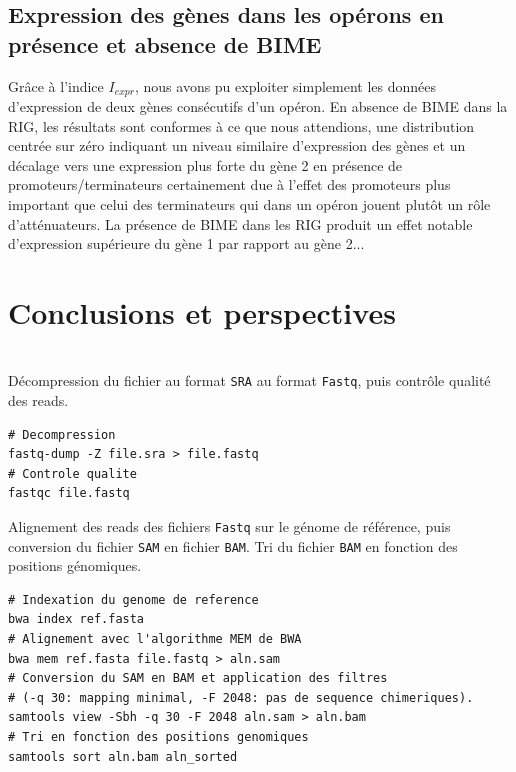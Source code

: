 \documentclass[12pt,a4paper]{report}
\begin{document}
\begin{onehalfspace}
\section*{Expression des gènes dans les opérons en présence et absence de BIME}
Grâce à l'indice $I_{expr}$, nous avons pu exploiter simplement les données d'expression de deux gènes consécutifs d'un opéron. En absence de BIME dans la RIG, les résultats sont conformes à ce que nous attendions, une distribution centrée sur zéro indiquant un niveau similaire d'expression des gènes et un décalage vers une expression plus forte du gène 2 en présence de promoteurs/terminateurs certainement due à l'effet des promoteurs plus important que celui des terminateurs qui dans un opéron jouent plutôt un rôle d'atténuateurs. La présence de BIME dans les RIG produit un effet notable d'expression supérieure du gène 1 par rapport au gène 2...




\chapter*{Conclusions et perspectives}

\end{onehalfspace}


\renewcommand{\thepage}{}
\printglossary[type=\acronymtype ,title=Glossaire]

%


\appendix

\chapter{}
\label{annexeCode}

Décompression du fichier au format \texttt{SRA} au format \texttt{Fastq}, puis contrôle qualité des reads.
\begin{lstlisting}[frame=single]
# Decompression
fastq-dump -Z file.sra > file.fastq
# Controle qualite
fastqc file.fastq
\end{lstlisting}

Alignement des reads des fichiers \texttt{Fastq} sur le génome de référence, puis conversion du fichier \texttt{SAM} en fichier \texttt{BAM}. Tri du fichier \texttt{BAM} en fonction des positions génomiques. 
\begin{lstlisting}[frame=single]
# Indexation du genome de reference
bwa index ref.fasta
# Alignement avec l'algorithme MEM de BWA
bwa mem ref.fasta file.fastq > aln.sam
# Conversion du SAM en BAM et application des filtres
# (-q 30: mapping minimal, -F 2048: pas de sequence chimeriques).
samtools view -Sbh -q 30 -F 2048 aln.sam > aln.bam
# Tri en fonction des positions genomiques
samtools sort aln.bam aln_sorted
\end{lstlisting}
\end{document}
